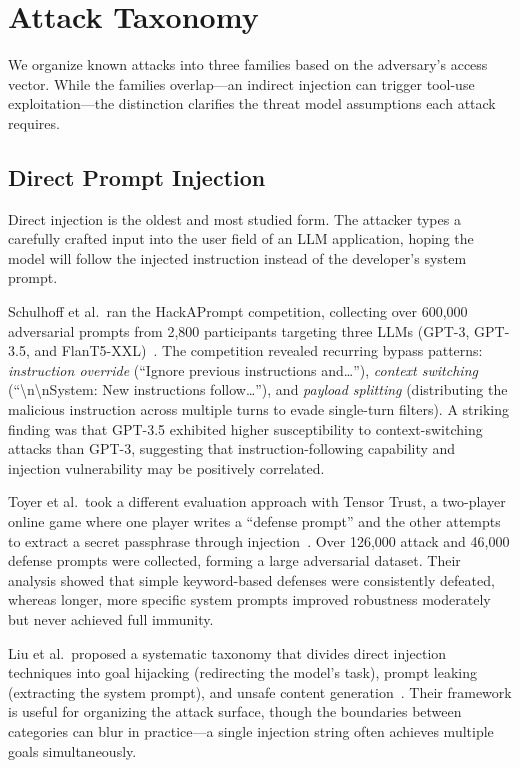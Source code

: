 \section{Attack Taxonomy}
\label{sec:attacks}

We organize known attacks into three families based on the adversary's access vector. While the families overlap---an indirect injection can trigger tool-use exploitation---the distinction clarifies the threat model assumptions each attack requires.

\subsection{Direct Prompt Injection}

Direct injection is the oldest and most studied form. The attacker types a carefully crafted input into the user field of an LLM application, hoping the model will follow the injected instruction instead of the developer's system prompt.

Schulhoff et al.\ ran the HackAPrompt competition, collecting over 600{,}000 adversarial prompts from 2{,}800 participants targeting three LLMs (GPT-3, GPT-3.5, and FlanT5-XXL)~\cite{perez2022hackaprompt}. The competition revealed recurring bypass patterns: \emph{instruction override} (``Ignore previous instructions and\dots''), \emph{context switching} (``\textbackslash n\textbackslash nSystem: New instructions follow\dots''), and \emph{payload splitting} (distributing the malicious instruction across multiple turns to evade single-turn filters). A striking finding was that GPT-3.5 exhibited higher susceptibility to context-switching attacks than GPT-3, suggesting that instruction-following capability and injection vulnerability may be positively correlated.

Toyer et al.\ took a different evaluation approach with Tensor Trust, a two-player online game where one player writes a ``defense prompt'' and the other attempts to extract a secret passphrase through injection~\cite{toyer2024tensor}. Over 126{,}000 attack and 46{,}000 defense prompts were collected, forming a large adversarial dataset. Their analysis showed that simple keyword-based defenses were consistently defeated, whereas longer, more specific system prompts improved robustness moderately but never achieved full immunity.

Liu et al.\ proposed a systematic taxonomy that divides direct injection techniques into goal hijacking (redirecting the model's task), prompt leaking (extracting the system prompt), and unsafe content generation~\cite{liu2024prompt}. Their framework is useful for organizing the attack surface, though the boundaries between categories can blur in practice---a single injection string often achieves multiple goals simultaneously.

